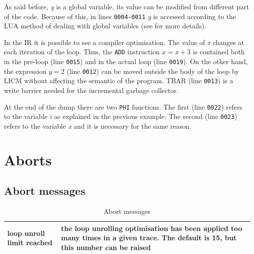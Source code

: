 As said before, \textit{y} is a global variable, its value can be modified from different part of the code. Because of this, in lines \texttt{0004-0011} \textit{y} is accessed according to the LUA method of dealing with global variables (see \cite{lua-ref-man} for more details).

In the IR it is possible to see a compiler optimisation. The value of \textit{x} changes at each iteration of the loop. Thus, the \texttt{ADD} instruction $x=x+3$ is contained both in the pre-loop (line \texttt{0015}) and in the actual loop (line \texttt{0019}). On the other hand, the expression $y=2$ (line \texttt{0012}) can be moved outside the body of the loop by LICM without affecting the semantic of the program. TBAR (line \texttt{0013}) is a write barrier needed for the incremental garbage collector.

At the end of the dump there are two \texttt{PHI} functions. The first (line \texttt{0022}) refers to the variable \textit{i} as explained in the previous example. The second (line \texttt{0023}) refers to the variable \textit{x} and it is necessary for the same reason.


\section{Aborts}

\subsection{Abort messages}

\begin{table}[H]
\centering
\begin{tabular}{|p{5cm}|p{8cm}|}
\hline
loop unroll limit reached & the loop unrolling  optimisation has been applied too many times in a given trace. The default is 15, but this number can be raised\\
\hline

\end{tabular}
\caption{Abort messages}
\label{tab:abort-messages}
\end{table}

\fi